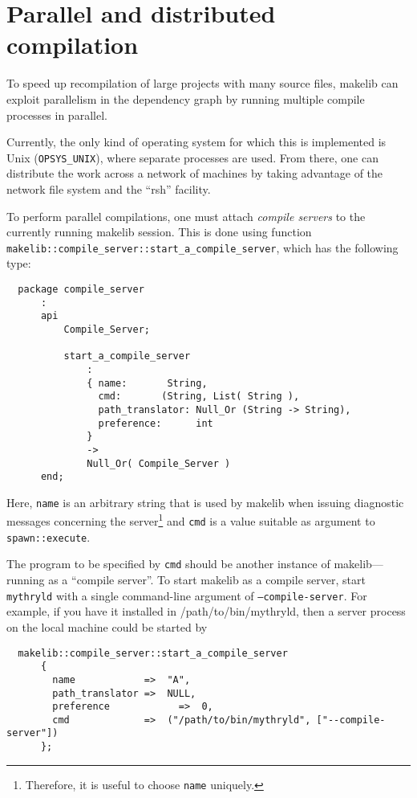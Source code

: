 
\section{Parallel and distributed compilation}
\label{sec:parmake}

To speed up recompilation of large projects with many source files,
makelib can exploit parallelism in the dependency graph by running
multiple compile processes in parallel.

Currently, the only kind of operating system for which this is
implemented is Unix ({\tt OPSYS\_UNIX}), where separate processes are
used.  From there, one can distribute the work across a network of
machines by taking advantage of the network file system and the
``rsh'' facility.

To perform parallel compilations, one must attach {\em compile
servers} to the currently running makelib session.  This is done using
function {\tt makelib::compile_server::start_a_compile_server}, which has the
following type:

\begin{verbatim}
  package compile_server
      :
      api
          Compile_Server;

          start_a_compile_server
              :
              { name:       String,
                cmd:       (String, List( String ),
                path_translator: Null_Or (String -> String),
                preference:      int
              }
              ->
              Null_Or( Compile_Server )
      end;
\end{verbatim}

Here, {\tt name} is an arbitrary string that is used by makelib when
issuing diagnostic messages concerning the server\footnote{Therefore,
it is useful to choose {\tt name} uniquely.} and {\tt cmd} is a value
suitable as argument to {\tt spawn::execute}.

The program to be specified by {\tt cmd} should be another instance of
makelib---running as a ``compile server''.  To start makelib as a compile
server, start {\tt mythryld} with a single command-line argument of
{\tt --compile-server}.
For example, if you have it installed in /path/to/bin/mythryld, then a
server process on the local machine could be started by

\begin{verbatim}
  makelib::compile_server::start_a_compile_server
      {
        name            =>  "A",
        path_translator =>  NULL,
        preference            =>  0,
        cmd             =>  ("/path/to/bin/mythryld", ["--compile-server"])
      };
\end{verbatim}

